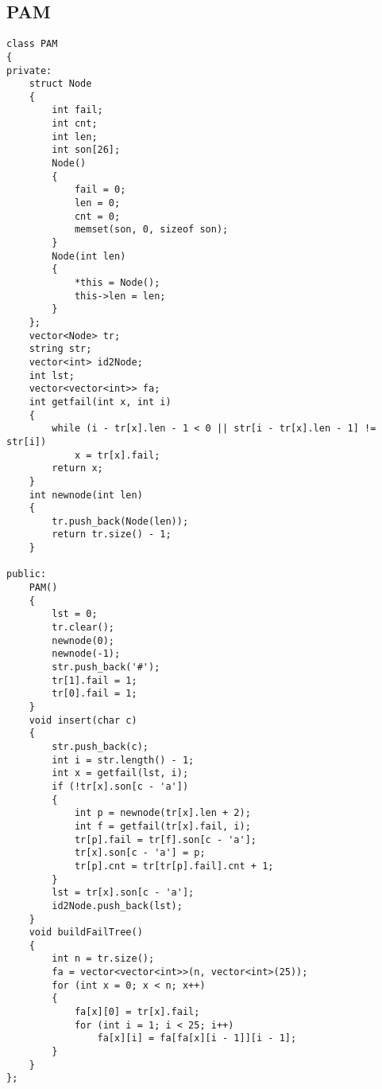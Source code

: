 \documentclass{ctexbook}  %
\begin{document}
\subsection{PAM}
\lstset{basicstyle=	tfamily}
\begin{Verbatim}[fontsize=\small]
class PAM
{
private:
    struct Node
    {
        int fail;
        int cnt;
        int len;
        int son[26];
        Node()
        {
            fail = 0;
            len = 0;
            cnt = 0;
            memset(son, 0, sizeof son);
        }
        Node(int len)
        {
            *this = Node();
            this->len = len;
        }
    };
    vector<Node> tr;
    string str;
    vector<int> id2Node;
    int lst;
    vector<vector<int>> fa;
    int getfail(int x, int i)
    {
        while (i - tr[x].len - 1 < 0 || str[i - tr[x].len - 1] != str[i])
            x = tr[x].fail;
        return x;
    }
    int newnode(int len)
    {
        tr.push_back(Node(len));
        return tr.size() - 1;
    }

public:
    PAM()
    {
        lst = 0;
        tr.clear();
        newnode(0);
        newnode(-1);
        str.push_back('#');
        tr[1].fail = 1;
        tr[0].fail = 1;
    }
    void insert(char c)
    {
        str.push_back(c);
        int i = str.length() - 1;
        int x = getfail(lst, i);
        if (!tr[x].son[c - 'a'])
        {
            int p = newnode(tr[x].len + 2);
            int f = getfail(tr[x].fail, i);
            tr[p].fail = tr[f].son[c - 'a'];
            tr[x].son[c - 'a'] = p;
            tr[p].cnt = tr[tr[p].fail].cnt + 1;
        }
        lst = tr[x].son[c - 'a'];
        id2Node.push_back(lst);
    }
    void buildFailTree()
    {
        int n = tr.size();
        fa = vector<vector<int>>(n, vector<int>(25));
        for (int x = 0; x < n; x++)
        {
            fa[x][0] = tr[x].fail;
            for (int i = 1; i < 25; i++)
                fa[x][i] = fa[fa[x][i - 1]][i - 1];
        }
    }
};
\end{Verbatim}
\end{document}
